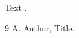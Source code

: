 \documentclass{scrartcl}
\begin{document}
Text \cite{a}.
\begin{thebibliography}{9}
 A. Author, Title.
\end{thebibliography}
\end{document}
